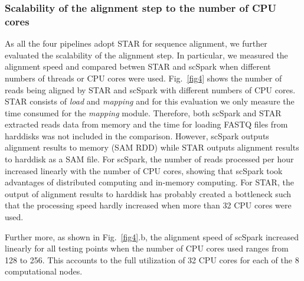 \documentclass[conference]{IEEEtran}
\begin{document}
\subsubsection{Scalability of the alignment step to the number of CPU cores}
As all the four pipelines adopt STAR for sequence alignment, we further evaluated the scalability of the alignment step. 
In particular, we measured the alignment speed and compared betwen STAR and scSpark when different numbers of threads or CPU cores were used. 
Fig.~\ref{fig4} shows the number of reads being aligned by STAR and scSpark with different numbers of CPU cores. 
STAR consists of \textit{load} and \textit{mapping} and for this evaluation we only measure the time consumed for the \textit{mapping} module. Therefore, both scSpark and STAR extracted reads data from memory and the time for loading FASTQ files from harddisks was not included in the comparison. However, scSpark outputs alignment results to memory (SAM RDD) while STAR outputs alignment results to harddisk as a SAM file.  
For scSpark, the number of reads processed per hour increased linearly with the number of CPU cores, showing that scSpark took advantages of distributed computing and in-memory computing. 
For STAR, the output of alignment results to harddisk has probably created a bottleneck such that the processing speed hardly increased when more than 32 CPU cores were used. 


Further more, as shown in Fig.~\ref{fig4}.b, the alignment speed of scSpark increased linearly for all testing points when the number of CPU cores used ranges from 128 to 256. This accounts to the full utilization of 32 CPU cores for each of the 8 computational nodes.  
\end{document}
